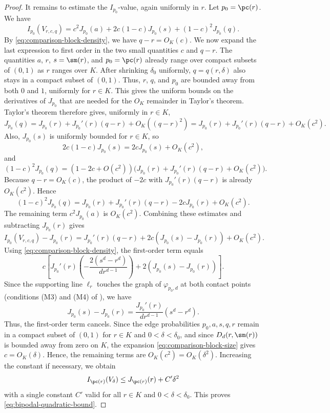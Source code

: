 \begin{proof}
It remains to estimate the $I_{p_0}$-value, again uniformly in $r$.  Let
$p_0=\pc(r)$.  We have
\[
  I_{p_0}(V_{r,c,q})
  =
  c^2J_{p_0}(a)+2c(1-c)J_{p_0}(s)+(1-c)^2J_{p_0}(q).
\]
By \eqref{eq:comparison-block-density}, we have $q-r=O_K(c)$.  We now expand the last
expression to first order in the two small quantities $c$ and $q-r$.  The
quantities $a$, $r$, $s=\sm(r)$, and
$p_0=\pc(r)$ already range over compact subsets of $(0,1)$ as $r$ ranges over
$K$.  After shrinking $\delta_0$ uniformly, $q=q(r,\delta)$ also stays in a
compact subset of $(0,1)$.  Thus, $r$, $q$, and $p_0$ are bounded away from
both $0$ and $1$, uniformly for $r\in K$.  This gives the uniform bounds on the
derivatives of $J_{p_0}$ that are needed for the $O_K$ remainder in Taylor's
theorem.  Taylor's theorem therefore gives, uniformly in $r\in K$,
\[
  J_{p_0}(q)
  =
  J_{p_0}(r)+J_{p_0}'(r)(q-r)+O_K((q-r)^2)
  =
  J_{p_0}(r)+J_{p_0}'(r)(q-r)+O_K(c^2).
\]
Also, $J_{p_0}(s)$ is uniformly bounded for $r\in K$, so
\[
  2c(1-c)J_{p_0}(s)
  =
  2cJ_{p_0}(s)+O_K(c^2),
\]
and
\[
  (1-c)^2J_{p_0}(q)
  =
  (1-2c+O(c^2))
  \bigl(J_{p_0}(r)+J_{p_0}'(r)(q-r)+O_K(c^2)\bigr).
\]
Because $q-r=O_K(c)$, the product of $-2c$ with
$J_{p_0}'(r)(q-r)$ is already $O_K(c^2)$.  Hence
\[
  (1-c)^2J_{p_0}(q)
  =
  J_{p_0}(r)+J_{p_0}'(r)(q-r)-2cJ_{p_0}(r)+O_K(c^2).
\]
The remaining term $c^2J_{p_0}(a)$ is $O_K(c^2)$.  Combining these estimates
and subtracting $J_{p_0}(r)$ gives
\[
  I_{p_0}(V_{r,c,q})-J_{p_0}(r)
  =
  J_{p_0}'(r)(q-r)+2c(J_{p_0}(s)-J_{p_0}(r))+O_K(c^2).
\]
Using \eqref{eq:comparison-block-density}, the first-order term equals
\[
  c\left[
    J_{p_0}'(r)\left(-\frac{2(s^d-r^d)}{d r^{d-1}}\right)
    +2(J_{p_0}(s)-J_{p_0}(r))
  \right].
\]
Since the supporting line $\ell_r$ touches the graph of $\varphi_{p_0,d}$ at
both contact points (conditions (M3) and (M4) of
), we have
\[
  J_{p_0}(s)-J_{p_0}(r)
  =\frac{J_{p_0}'(r)}{d r^{d-1}}(s^d-r^d).
\]
Thus, the first-order term cancels.  Since the edge probabilities
$p_0,a,s,q,r$ remain in a compact subset of $(0,1)$ for $r\in K$ and
$0<\delta<\delta_0$, and since $D_d(r,\sm(r))$ is bounded away from zero on
$K$, the expansion \eqref{eq:comparison-block-size} gives $c=O_K(\delta)$.  Hence, the
remaining terms are
$O_K(c^2)=O_K(\delta^2)$.  Increasing the constant if necessary, we obtain
\[
  I_{\pc(r)}(V_\delta)
  \le
  J_{\pc(r)}(r)+C'\delta^2
\]
with a single constant $C'$ valid for all $r\in K$ and
$0<\delta<\delta_0$.  This proves \eqref{eq:bipodal-quadratic-bound}.
\end{proof}

